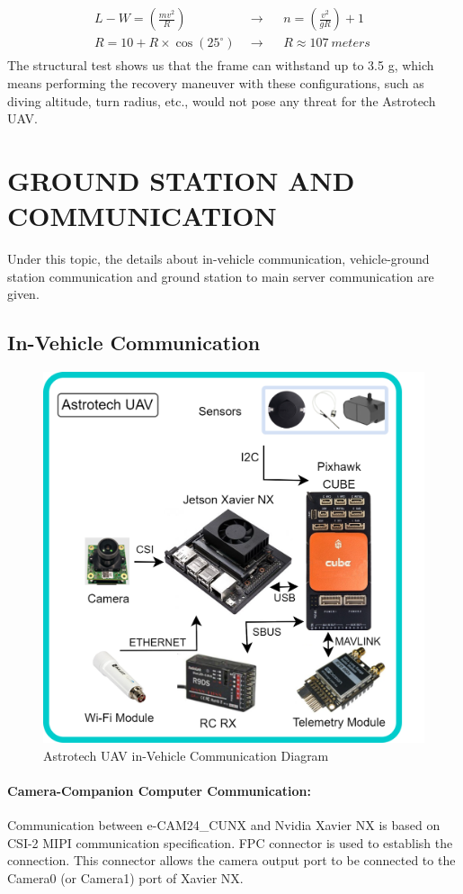 \documentclass[12pt]{article}
\begin{document}
\begin{align}
    L - W = (\frac{mv^2}{R}) & \ \ \xrightarrow{}& &n = (\frac{v^2}{gR}) +1 \\
    R = 10+ R \times \cos(25^{\circ}) &\ \ \xrightarrow[]{}& & R \approx 107 \ meters\
\end{align}
\justify The structural test shows us that the frame can withstand up to 3.5 g, which means performing the recovery maneuver with these configurations, such as diving altitude, turn radius, etc., would not pose any threat for the Astrotech UAV.

\section{GROUND STATION AND COMMUNICATION}
Under this topic, the details about in-vehicle communication, vehicle-ground station communication and ground station to main server communication are given.
\subsection{In-Vehicle Communication}

\begin{figure}[ht]
 	\centering
 	\includegraphics[width = .5\linewidth]{unnamed (24).png}
 	\caption{Astrotech UAV in-Vehicle Communication Diagram}
        \label{fig:in_veh_com}
 \end{figure}
\FloatBarrier

\paragraph*{Camera-Companion Computer Communication:} Communication between e-CAM24\_CUNX and Nvidia Xavier NX is based on CSI-2 MIPI communication specification. FPC connector is used to establish the connection. This connector allows the camera output port to be connected to the Camera0 (or Camera1) port of Xavier NX.
\end{document}

